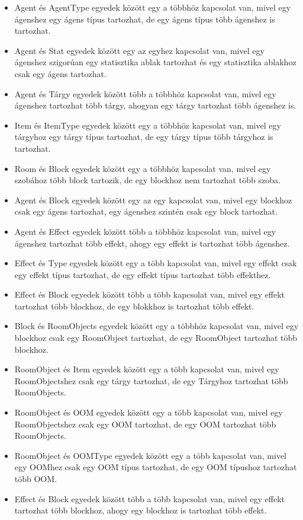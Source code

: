 \begin{itemize}
    \item Agent és AgentType egyedek között egy a többhöz kapcsolat van, mivel egy ágenshez egy ágens típus tartozhat, de egy ágens típus több ágenshez is tartozhat.
    \item Agent és Stat egyedek között egy az egyhez kapcsolat van, mivel egy ágenshez szigorúan egy statisztika ablak tartozhat és egy statisztika ablakhoz csak egy ágens tartozhat.
    \item Agent és Tárgy egyedek között több a többhöz kapcsolat van, mivel egy ágenshez tartozhat több tárgy, ahogyan egy tárgy tartozhat több ágenshez is.
    \item Item és ItemType egyedek között egy a többhöz kapcsolat van, mivel egy tárgyhoz egy tárgy típus tartozhat, de egy tárgy típus több tárgyhoz is tartozhat.
    \item Room és Block egyedek között egy a többhöz kapcsolat van, mivel egy szobához több block tartozik, de egy blockhoz nem tartozhat több szoba.
    \item Agent és Block egyedek között egy az egy kapcsolat van, mivel egy blockhoz csak egy ágens tartozhat, egy ágenshez szintén csak egy block tartozhat.
    \item Agent és Effect egyedek között több a többhöz kapcsolat van, mivel egy ágenshez tartozhat több effekt, ahogy egy effekt is tartozhat több ágenshez.
    \item Effect és Type egyedek között egy a több kapcsolat van, mivel egy effekt csak egy effekt típus tartozhat, de egy effekt típus tartozhat több effekthez.
    \item Effect és Block egyedek között több a több kapcsolat van, mivel egy effekt tartozhat több blockhoz, de egy blokkhoz is tartozhat több effekt.
    \item Block és RoomObjects egyedek között egy a többhöz kapcsolat van, mivel egy blockhoz csak egy RoomObject tartozhat, de egy RoomObject tartozhat több blockhoz.
    \item RoomObject és Item egyedek között egy a több kapcsolat van, mivel egy RoomObjectshez csak egy tárgy tartozhat, de egy Tárgyhoz tartozhat több RoomObjects.
    \item RoomObject és OOM egyedek között egy a több kapcsolat van, mivel egy RoomObjectshez csak egy OOM tartozhat, de egy OOM tartozhat több RoomObjects.
    \item RoomObject és OOMType egyedek között egy a több kapcsolat van, mivel egy OOMhez csak egy OOM típus tartozhat, de egy OOM típushoz tartozhat több OOM.
    \item Effect és Block egyedek között több a több kapcsolat van, mivel egy effekt tartozhat több blockhoz, ahogy egy blockhoz is tartozhat több effekt.

\end{itemize}

